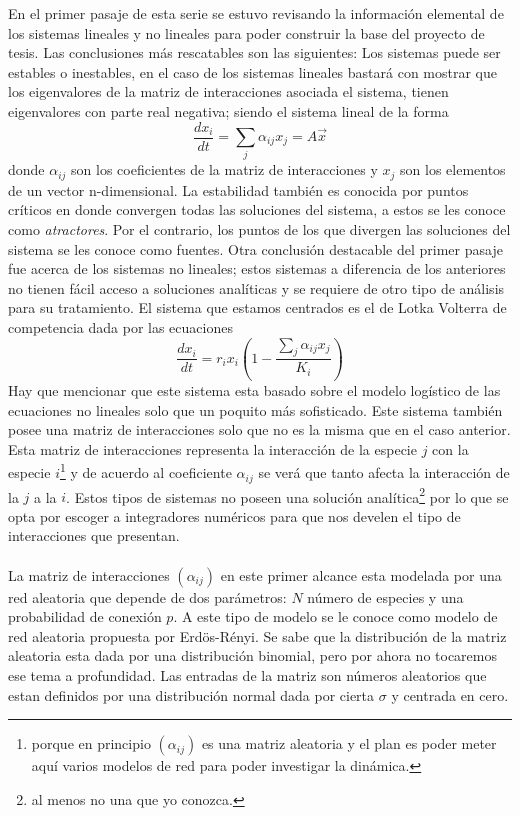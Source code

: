 \documentclass[11pt,a4paper]{article}
\begin{document}
En el primer pasaje de esta serie se estuvo revisando la información elemental de los sistemas lineales y no lineales para poder construir la base del proyecto de tesis. Las conclusiones más rescatables son las siguientes: Los sistemas puede ser estables o inestables, en el caso de los sistemas lineales bastará con mostrar que los eigenvalores de la matriz de interacciones asociada el sistema, tienen eigenvalores con parte real negativa; siendo el sistema lineal de la forma
$$\frac{dx_i}{dt}=\sum_j \alpha_{ij}x_j=A\vec{x}$$
donde $\alpha_{ij}$ son los coeficientes de la matriz de interacciones y $x_j$ son los elementos de un vector n-dimensional. La estabilidad también es conocida por puntos críticos en donde convergen todas las soluciones del sistema,  a estos se les conoce como \textit{atractores}. Por el contrario, los puntos de los que divergen las soluciones del sistema se les conoce como fuentes. Otra conclusión destacable del primer pasaje fue acerca de los sistemas no lineales; estos sistemas a diferencia de los anteriores no tienen fácil acceso a soluciones analíticas y se requiere de otro tipo de análisis para su tratamiento. El sistema que estamos centrados es el de Lotka Volterra de competencia dada por las ecuaciones
\begin{equation}\label{eq:sisLK}
\frac{dx_i}{dt}=r_ix_i\left (1-\frac{\sum_j \alpha_{ij}x_j}{K_i}\right )
\end{equation}
Hay que mencionar que este sistema esta basado sobre el modelo logístico de las ecuaciones no lineales solo que un poquito más sofisticado. Este sistema también posee una matriz de interacciones solo que no es la misma que en el caso anterior. Esta matriz de interacciones representa la interacción de la especie $j$ con la especie $i$\footnote{porque en principio $(\alpha_{ij})$ es una matriz aleatoria y el plan es poder meter aquí varios modelos de red para poder investigar la dinámica.} y de acuerdo al coeficiente $\alpha_{ij}$ se verá que tanto afecta la interacción de la $j$ a la $i$. Estos tipos de sistemas no poseen una solución analítica\footnote{al menos no una que yo conozca.} por lo que se opta por escoger a integradores numéricos para que nos develen el tipo de interacciones que presentan.\\
\\
La matriz de interacciones $(\alpha_{ij})$ en este primer alcance esta modelada por una red aleatoria que depende de dos parámetros: $N$ número de especies y una probabilidad de conexión $p$. A este tipo de modelo se le conoce como modelo de red aleatoria propuesta por Erdös-Rényi. Se sabe que la distribución de la matriz aleatoria esta dada por una distribución binomial, pero por ahora no tocaremos ese tema a profundidad. Las entradas de la matriz son números aleatorios que estan definidos por una distribución normal dada por cierta $\sigma$ y centrada en cero.
\end{document}
